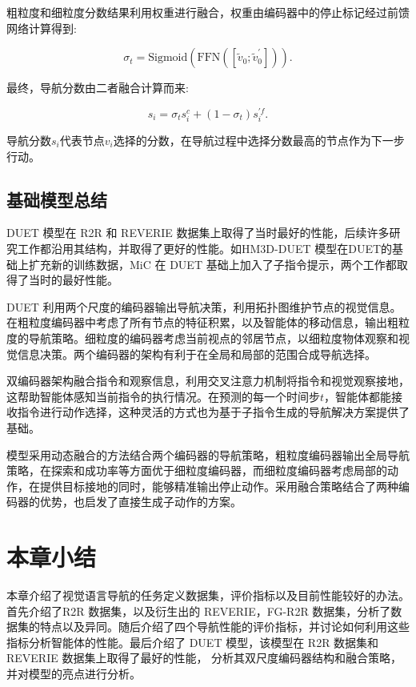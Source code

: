 \documentclass[bachelor]{thesis-uestc}
\begin{document}
粗粒度和细粒度分数结果利用权重进行融合，权重由编码器中的停止标记经过前馈网络计算得到:

\begin{equation}
    \sigma_t = \text{Sigmoid}(\text{FFN}([\tilde{v}_0; \tilde{v}^{\prime}_0])).
\label{ffn}
\end{equation}

最终，导航分数由二者融合计算而来:

\begin{equation}
    s_i = \sigma_t s^c_i + (1 - \sigma_t) s^{\prime f}_i.
\label{sce}
\end{equation}

导航分数$s_i$代表节点$v_i$选择的分数，在导航过程中选择分数最高的节点作为下一步行动。

\subsection{基础模型总结}
DUET 模型在 R2R 和 REVERIE 数据集上取得了当时最好的性能，后续许多研究工作都沿用其结构，并取得了更好的性能。如HM3D-DUET \cite{chenLearningUnlabeled3D2022}模型在DUET的基础上扩充新的训练数据，MiC 在 DUET 基础上加入了子指令提示，两个工作都取得了当时的最好性能。

DUET 利用两个尺度的编码器输出导航决策，利用拓扑图维护节点的视觉信息。在粗粒度编码器中考虑了所有节点的特征积累，以及智能体的移动信息，输出粗粒度的导航策略。细粒度的编码器考虑当前视点的邻居节点，以细粒度物体观察和视觉信息决策。两个编码器的架构有利于在全局和局部的范围合成导航选择。

双编码器架构融合指令和观察信息，利用交叉注意力机制将指令和视觉观察接地，这帮助智能体感知当前指令的执行情况。在预测的每一个时间步$t$，智能体都能接收指令进行动作选择，这种灵活的方式也为基于子指令生成的导航解决方案提供了基础。

模型采用动态融合的方法结合两个编码器的导航策略，粗粒度编码器输出全局导航策略，在探索和成功率等方面优于细粒度编码器，而细粒度编码器考虑局部的动作，在提供目标接地的同时，能够精准输出停止动作。采用融合策略结合了两种编码器的优势，也启发了直接生成子动作的方案。

\section{本章小结}

本章介绍了视觉语言导航的任务定义数据集，评价指标以及目前性能较好的办法。首先介绍了R2R 数据集，以及衍生出的 REVERIE，FG-R2R 数据集，分析了数据集的特点以及异同。随后介绍了四个导航性能的评价指标，并讨论如何利用这些指标分析智能体的性能。最后介绍了 DUET 模型，该模型在 R2R 数据集和 REVERIE 数据集上取得了最好的性能， 分析其双尺度编码器结构和融合策略，并对模型的亮点进行分析。
\end{document}
